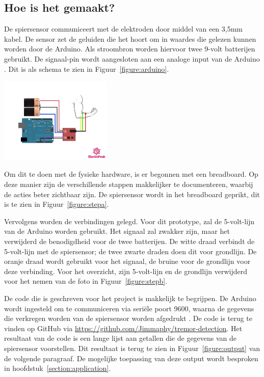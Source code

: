 \subsection{Hoe is het gemaakt?}

De spiersensor communiceert met de elektroden door middel van een 3,5mm kabel.
De sensor zet de geluiden die het hoort om in waardes die gelezen kunnen worden door de Arduino.
Als stroombron worden hiervoor twee 9-volt batterijen gebruikt.
De signaal-pin wordt aangesloten aan een analoge input van de Arduino \cite{emg2021}.
Dit is als schema te zien in Figuur~\ref{figure:arduino}.

\begin{center}
    \includegraphics[width=0.4\textwidth]{./graphics/graph-arduino.jpg}
    \label{figure:arduino}
\end{center}

Om dit te doen met de fysieke hardware, is er begonnen met een breadboard.
Op deze manier zijn de verschillende stappen makkelijker te documenteren,
waarbij de acties beter zichtbaar zijn.
De spiersensor wordt in het breadboard geprikt, dit is te zien in Figuur~\ref{figure:stepa}.

Vervolgens worden de verbindingen gelegd.
Voor dit prototype, zal de 5-volt-lijn van de Arduino worden gebruikt.
Het signaal zal zwakker zijn, maar het verwijderd de benodigdheid voor de twee batterijen.
De witte draad verbindt de 5-volt-lijn met de spiersensor; de twee zwarte draden doen dit voor grondlijn.
De oranje draad wordt gebruikt voor het signaal, de bruine voor de grondlijn voor deze verbinding.
Voor het overzicht, 
zijn 5-volt-lijn en de grondlijn verwijderd voor het nemen van de foto in Figuur~\ref{figure:stepb}.

De code die is geschreven voor het project is makkelijk te begrijpen.
De Arduino wordt ingesteld om te communiceren via seriële poort 9600,
waarna de gegevens die verkregen worden van de spiersensor worden afgedrukt \cite{emg2021}.
De code is terug te vinden op GitHub via \url{https://github.com/Jimmaphy/tremor-detection}.
Het resultaat van de code is een lange lijst aan getallen die de gegevens van de spiersensor voorstellen.
Dit resultaat is terug te zien in Figuur~\ref{figure:output} van de volgende paragraaf.
De mogelijke toepassing van deze output wordt besproken in hoofdstuk~\ref{section:application}.


